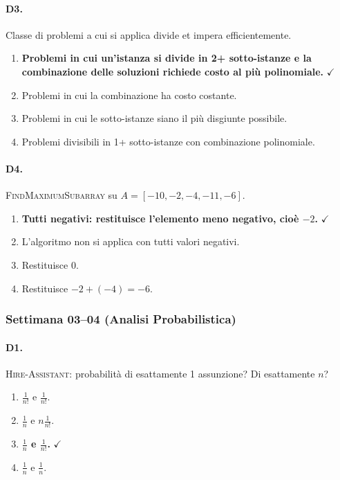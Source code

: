 \paragraph{D3.} Classe di problemi a cui si applica divide et impera efficientemente.
\begin{enumerate}[label=\Alph*.,leftmargin=*]
	\item \textcolor{correctgreen}{\textbf{Problemi in cui un'istanza si divide in 2+ sotto-istanze e la combinazione delle soluzioni richiede costo al pi\`u polinomiale.}} \hfill\textcolor{correctgreen}{$\checkmark$}
	\item Problemi in cui la combinazione ha costo costante.
	\item Problemi in cui le sotto-istanze siano il pi\`u disgiunte possibile.
	\item Problemi divisibili in 1+ sotto-istanze con combinazione polinomiale.
\end{enumerate}

\paragraph{D4.} \textsc{FindMaximumSubarray} su $A = [-10, -2, -4, -11, -6]$.
\begin{enumerate}[label=\Alph*.,leftmargin=*]
	\item \textcolor{correctgreen}{\textbf{Tutti negativi: restituisce l'elemento meno negativo, cio\`e $-2$.}} \hfill\textcolor{correctgreen}{$\checkmark$}
	\item L'algoritmo non si applica con tutti valori negativi.
	\item Restituisce $0$.
	\item Restituisce $-2 + (-4) = -6$.
\end{enumerate}

\subsubsection{Settimana 03--04 (Analisi Probabilistica)}

\paragraph{D1.} \textsc{Hire-Assistant}: probabilit\`a di esattamente 1 assunzione? Di esattamente $n$?
\begin{enumerate}[label=\Alph*.,leftmargin=*]
	\item $\frac{1}{n!}$ e $\frac{1}{n!}$.
	\item $\frac{1}{n}$ e $n\frac{1}{n!}$.
	\item \textcolor{correctgreen}{\textbf{$\frac{1}{n}$ e $\frac{1}{n!}$.}} \hfill\textcolor{correctgreen}{$\checkmark$}
	\item $\frac{1}{n}$ e $\frac{1}{n}$.
\end{enumerate}

